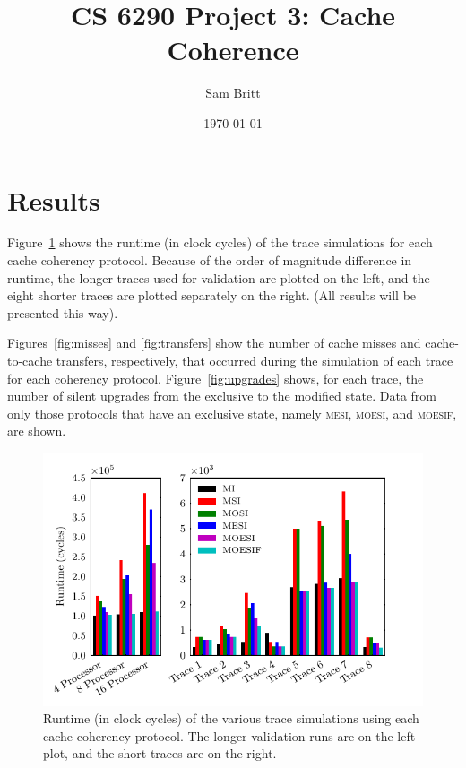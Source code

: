 \documentclass{article}
\title{CS 6290 Project 3: Cache Coherence}
\author{Sam Britt}
\date{\today}
\newcommand\figsize{.9\linewidth}
\newcommand\prot[1]{\textsc{#1}}
\newcommand\MESI{\prot{mesi}\xspace}
\newcommand\MOESI{\prot{moesi}\xspace}
\newcommand\MOESIF{\prot{moesif}\xspace}
\begin{document}
  \maketitle

  \section{Results}
  \label{sec:results}
  Figure~\ref{fig:runtime} shows the runtime (in clock cycles) of the
  trace simulations for each cache coherency protocol. Because of the
  order of magnitude difference in runtime, the longer traces used for
  validation are plotted on the left, and the eight shorter traces are
  plotted separately on the right. (All results will be presented this
  way).

  Figures~\ref{fig:misses} and \ref{fig:transfers} show the number of
  cache misses and cache-to-cache transfers, respectively, that
  occurred during the simulation of each trace for each coherency
  protocol. Figure~\ref{fig:upgrades} shows, for each trace, the
  number of silent upgrades from the exclusive to the modified state.
  Data from only those protocols that have an exclusive state, namely
  \MESI, \MOESI, and \MOESIF, are shown.

  \begin{figure}[htbp]
    \label{fig:runtime}
    \centering
    \begin{minipage}[t]{\figsize}
      \centering
      \includegraphics[width=\linewidth]{../runs/plots/runtime}
      \caption{Runtime (in clock cycles) of the various trace
        simulations using each cache coherency protocol. The longer
        validation runs are on the left plot, and the short traces are
        on the right.}
    \end{minipage}
  \end{figure}
\end{document}
